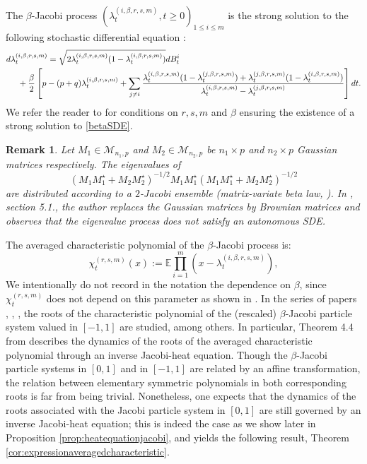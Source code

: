 \documentclass[12pt,reqno]{amsart}
\newtheorem{remark}{Remark}
\begin{document}
The $\beta$-Jacobi process $(\lambda_t^{(i,\beta,r,s,m)},t\geq 0)_{1\leq i\leq m}$ is the strong solution to the following stochastic differential equation : 
\newcommand{\lambdaprbetai}{\lambda_t^{(i,\beta,r,s,m)}}
\newcommand{\lambdaprbetaj}{\lambda_t^{(j,\beta, r,s,m)}}
\begin{align}\label{betaSDE}
	d\lambdaprbetai &= \sqrt{2\lambdaprbetai(1-\lambdaprbetai)}dB_t^i \\ 
    &\hspace{-1.25cm}+ \frac{\beta}{2}\left[
		p-(p+q)\lambdaprbetai + \sum_{j \neq i}\frac{\lambdaprbetai(1-\lambdaprbetaj) + \lambdaprbetaj(1-\lambdaprbetai)}{\lambdaprbetai-\lambdaprbetaj}\right] dt \nonumber.
\end{align}
We refer the reader to \cite{MR2719370} for conditions on $r,s,m$ and $\beta$ ensuring the existence of a strong solution to \eqref{betaSDE}.
\begin{remark}
\label{remark:marcus}
    Let $M_1 \in \mathcal{M}_{n_1,p}$ and $M_2 \in \mathcal{M}_{n_2,p}$ be $n_1 \times p$ and $n_2 \times p$ Gaussian matrices respectively. 
    The eigenvalues of 
\begin{equation*}
(M_1M^{\star}_1+M_2M^{\star}_2)^{-1/2}M_1M^{\star}_1(M_1M^{\star}_1+M_2M^{\star}_2)^{-1/2}
\end{equation*}
are distributed according to a $2$-Jacobi ensemble (matrix-variate beta law, \cite{collins2004}). In \cite{FFPP}, section 5.1., 
the author replaces the Gaussian matrices by Brownian matrices and observes that the eigenvalue process does not satisfy an autonomous SDE.
\end{remark}
The averaged characteristic polynomial of the $\beta$-Jacobi process is:
\begin{equation}
\label{eqn:charatersticpoly}
	\chi_t^{(r,s,m)}(x) := \mathbb{E}\prod_{i=1}^m(x-\lambdaprbetai),
\end{equation}
\newcommand{\charpoly}{\chi_t^{(r,s,m)}}
We intentionally do not record in the notation the dependence on $\beta$, since $\chi_t^{(r,s,m)}$ does not depend on this parameter as shown in \cite[Corollary 3.4]{MR4092353}.
In the series of papers \cite{MR4092353}, \cite{MR4673381}, \cite{MR4781073}, the roots of the characteristic polynomial of the (rescaled) $\beta$-Jacobi particle system valued in $[-1,1]$ are studied, among others. 
In particular, Theorem 4.4 from \cite{MR4781073} describes the dynamics of the roots of the averaged characteristic polynomial through an inverse Jacobi-heat equation.
Though the $\beta$-Jacobi particle systems in $[0,1]$ and in $[-1,1]$ are related by an affine transformation, the relation between elementary symmetric polynomials in both corresponding roots is far from being trivial. Nonetheless, one expects that the dynamics of the roots associated with the Jacobi particle system in $[0,1]$ are still governed by an inverse Jacobi-heat equation; this is indeed the case as we show later in Proposition \ref{prop:heatequationjacobi}, and yields the following result, Theorem \ref{cor:expressionaveragedcharacteristic}. 
\end{document}
